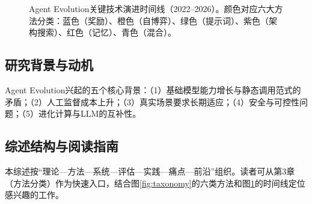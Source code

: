 \begin{figure}[htbp]
\caption{Agent Evolution关键技术演进时间线（2022--2026）。颜色对应六大方法分类：蓝色（奖励）、橙色（自博弈）、绿色（提示词）、紫色（架构搜索）、红色（记忆）、青色（混合）。}
\label{fig:timeline}
\end{figure}

\subsection{研究背景与动机}

Agent Evolution兴起的五个核心背景：（1）基础模型能力增长与静态调用范式的矛盾；（2）人工监督成本上升；（3）真实场景要求长期适应；（4）安全与可控性问题；（5）进化计算与LLM的互补性。

\subsection{综述结构与阅读指南}

本综述按``理论—方法—系统—评估—实践—痛点—前沿''组织。读者可从第3章（方法分类）作为快速入口，结合图\ref{fig:taxonomy}的六类方法和图\ref{fig:timeline}的时间线定位感兴趣的工作。
